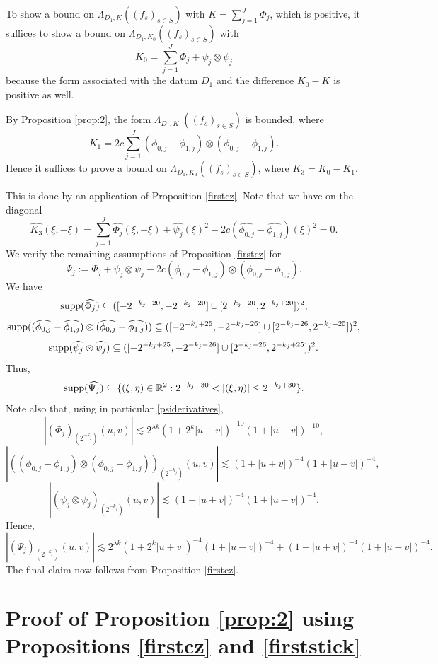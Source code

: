 \documentclass[12pt,reqno]{amsart}
\theoremstyle{plain}
\theoremstyle{definition}
\numberwithin{equation}{section}
\newcommand{\R}{{\mathbb R}}
\begin{document}
To show a bound on $\Lambda_{D_1,K}((f_s)_{s\in S})$ with
$K=\sum_{j=1}^J\Phi_j$, which is positive,
it suffices to show a bound on $\Lambda_{D_1,K_0}((f_s)_{s\in S})$
with
$$K_0=\sum_{j=1}^J \Phi_j + \psi_j\otimes {\psi_j}$$
because the form associated with the datum $D_1$ and the difference $K_0-K$ is positive as well.

By Proposition \ref{prop:2}, the form $\Lambda_{D_1,K_1}((f_s)_{s\in S})$
is bounded, where
\[{K_1} ={2c}\sum_{j=1}^J ({\phi_{0,j}}-{\phi_{1,j}})\otimes 
({\phi_{0,j}}-{\phi_{1,j}}).
\]
Hence it suffices to prove a bound on $\Lambda_{D_1,K_3}((f_s)_{s\in S})$, where
$K_3=K_0-K_1$.

This is done by an application of Proposition \ref{firstcz}.
Note that we have on the diagonal
$$\widehat{K_3}(\xi,-\xi)=
\sum_{j=1}^J 
 \widehat{\Phi_j}(\xi,-\xi) + \widehat{\psi_j}(\xi)^2 - {2c}
({\widehat{\phi_{0,j}}}-{\widehat{\phi_{1,j}}})(\xi)^2=0.$$
We verify the remaining assumptions of Proposition \ref{firstcz} for
\[\Psi_j:=\Phi_j + \psi_j\otimes {\psi_j}- {2c}
({\phi_{0,j}}-{\phi_{1,j}})\otimes ({\phi_{0,j}}-{\phi_{1,j}}).\]
We have
\[\textup{supp}(\widehat{\Phi_j}) \subseteq ([-2^{-k_j+20},-2^{-k_j-20}]\cup [2^{-k_j-20},2^{-k_j+20}])^2,\]
\[\textup{supp}((\widehat{\phi_{0,j}}-\widehat{\phi_{1,j}})\otimes (\widehat{\phi_{0,j}}-\widehat{\phi_{1,j}}) ) \subseteq ([-2^{-k_j+25},-2^{-k_j-26}]\cup [2^{-k_j-26},2^{-k_j+25}]{)^2},\]
\[\textup{supp}(\widehat{\psi_j}\otimes \widehat{\psi_j}) \subseteq ([-2^{-k_j+25},-2^{-k_j-26}]\cup [2^{-k_j-26},2^{-k_j+25}])^2.\]
Thus,
\[\textup{supp}(\widehat{\Psi_j}) \subseteq  \{(\xi,\eta)\in \R^2: 2^{-k_j-30} < |(\xi,\eta)| \leq 2^{-k_j+30}\}.\]
Note also that, using in particular \eqref{psiderivatives},
\[|(\Phi_j)_{(2^{-k_j})}(u,v)| \lesssim 2^{\lambda k}  (1+2^k|u+v|)^{-10} (1+|u-v|)^{-10}, \]
\[|((\phi_{0,j}- \phi_{1,j})\otimes (\phi_{0,j}- \phi_{1,j}))_{(2^{-k_j})}(u,v)| \lesssim   (1+|u+v|)^{-4} (1+|u-v|)^{-4}, \]
\[|(\psi_j\otimes \psi_j)_{(2^{-k_j})}(u,v)| \lesssim (1+|u+v|)^{-4} (1+|u-v|)^{-4}. \]
Hence,
\[|(\Psi_j)_{(2^{-k_j})}(u,v)| \lesssim  2^{\lambda k} (1+2^k|u+v|)^{-4} (1+|u-v|)^{-4}+ (1+|u+v|)^{-4} (1+|u-v|)^{-4}. \]
 The final claim now follows from Proposition \ref{firstcz}.



 



\section{Proof of Proposition \ref{prop:2} using Propositions \ref{firstcz}
and  \ref{firststick}}
 \label{sec:prop:2}
 
\end{document}
